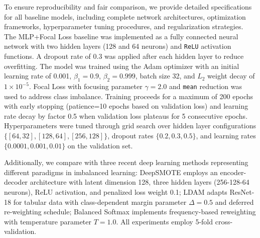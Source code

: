 \documentclass[a4paper]{cas-sc}
\begin{document}
{\color{magenta}To ensure reproducibility and fair comparison, we provide detailed specifications for all baseline models, including complete network architectures, optimization frameworks, hyperparameter tuning procedures, and regularization strategies. The MLP+Focal Loss baseline was implemented as a fully connected neural network with two hidden layers (128 and 64 neurons) and \texttt{ReLU} activation functions. A dropout rate of 0.3 was applied after each hidden layer to reduce overfitting. The model was trained using the Adam optimizer with an initial learning rate of 0.001, $\beta_1=0.9$, $\beta_2=0.999$, batch size 32, and $L_2$ weight decay of $1\times10^{-5}$. Focal Loss with focusing parameter $\gamma = 2.0$ and \texttt{mean} reduction was used to address class imbalance. Training proceeds for a maximum of 200 epochs with early stopping (patience=10 epochs based on validation loss) and learning rate decay by factor 0.5 when validation loss plateaus for 5 consecutive epochs. Hyperparameters were tuned through grid search over hidden layer configurations $\{[64,32], [128,64], [256,128]\}$, dropout rates $\{0.2, 0.3, 0.5\}$, and learning rates $\{0.0001, 0.001, 0.01\}$ on the validation set.}

{\color{magenta}Additionally, we compare with three recent deep learning methods representing different paradigms in imbalanced learning: DeepSMOTE \citep{dablain2022deepsmote} employs an encoder-decoder architecture with latent dimension 128, three hidden layers (256-128-64 neurons), ReLU activation, and penalized loss weight 0.1; LDAM \citep{cao2019learning} adapts ResNet-18 for tabular data with class-dependent margin parameter $\Delta=0.5$ and deferred re-weighting schedule; Balanced Softmax \citep{ren2020balanced} implements frequency-based reweighting with temperature parameter $T=1.0$. All experiments employ 5-fold cross-validation.}
\end{document}
